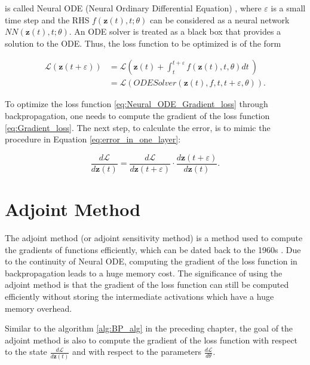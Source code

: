 \documentclass[
	parskip, 			   %
	twoside, 			   %
	DIV=14, 			   %
	BCOR=15.0mm, 		   %
	headsepline, 		   %
	open=right, 		   %
	captions=tableheading, %
	bibliography=totoc,    %
	numbers=noenddot       %
]{scrreprt}
\begin{document}
is called Neural ODE (Neural Ordinary Differential Equation) \cite{chen2018neural}, where $\varepsilon $ is a small time step and the RHS $f(\mathbf{z}(t), t; \theta)$ can be considered as a neural network $NN(\mathbf{z}(t), t; \theta)$. An ODE solver is treated as a black box that provides a solution to the ODE. Thus, the loss function to be optimized is of the form

\begin{equation}
    \label{eq:Neural_ODE_Gradient_loss}
    \begin{aligned}
    \mathcal{L}(\mathbf{z}(t+\varepsilon )) &= \mathcal{L}(\mathbf{z}(t) + \int_{t}^{t+\varepsilon } f(\mathbf{z}(t), t, \theta)dt \:)\\
    &= \mathcal{L}(ODESolver(\mathbf{z}(t), f, t, t+\varepsilon , \theta)).
    \end{aligned}
\end{equation}

To optimize the loss function \ref{eq:Neural_ODE_Gradient_loss} through backpropagation, one needs to compute the gradient of the loss function \ref{eq:Gradient_loss}. The next step, to calculate the error, is to mimic the procedure in Equation \ref{eq:error_in_one_layer}:

\begin{equation}
    \label{eq:Neural_ODE_error}
    \frac{d\mathcal{L}}{d\mathbf{z}(t)} = \frac{d\mathcal{L}}{d\mathbf{z}(t+\varepsilon )} \cdot \frac{d\mathbf{z}(t+\varepsilon )}{d\mathbf{z}(t)}.
\end{equation}

\section{Adjoint Method}
The adjoint method (or adjoint sensitivity method) is a method used to compute the gradients of functions efficiently, which can be dated back to the 1960s \cite{boltyanskiy1962mathematical}. Due to the continuity of Neural ODE, computing the gradient of the loss function in backpropagation leads to a huge memory cost. The significance of using the adjoint method is that the gradient of the loss function can still be computed efficiently without storing the intermediate activations which have a huge memory overhead.

Similar to the algorithm \ref{alg:BP_alg} in the preceding chapter, the goal of the adjoint method is also to compute the gradient of the loss function with respect to the state $\frac{d\mathcal{L}}{d\mathbf{z}(t)}$ and with respect to the parameters $\frac{d\mathcal{L}}{d\theta}$.
\end{document}
